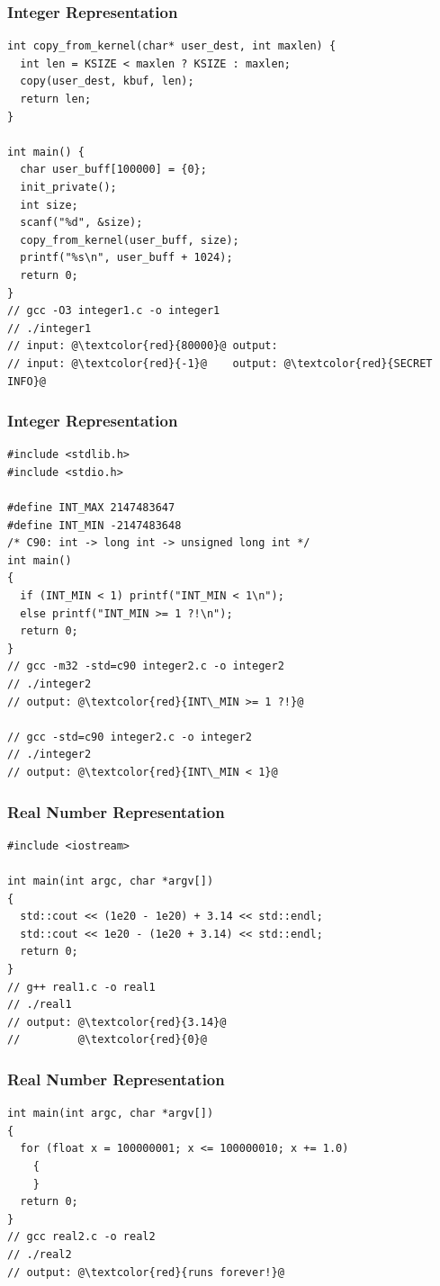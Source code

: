 \documentclass{beamer}
\begin{document}
\begin{frame}[fragile]
\frametitle{Integer Representation}
\scriptsize
\begin{lstlisting}
int copy_from_kernel(char* user_dest, int maxlen) {
  int len = KSIZE < maxlen ? KSIZE : maxlen;
  copy(user_dest, kbuf, len);
  return len;
}

int main() {
  char user_buff[100000] = {0};
  init_private();
  int size;
  scanf("%d", &size);
  copy_from_kernel(user_buff, size);
  printf("%s\n", user_buff + 1024);
  return 0;
}
// gcc -O3 integer1.c -o integer1
// ./integer1
// input: @\textcolor{red}{80000}@ output:
// input: @\textcolor{red}{-1}@    output: @\textcolor{red}{SECRET INFO}@
\end{lstlisting}

\end{frame}

\begin{frame}[fragile]
\frametitle{Integer Representation}
\scriptsize
\begin{lstlisting}
#include <stdlib.h>
#include <stdio.h>

#define INT_MAX 2147483647
#define INT_MIN -2147483648
/* C90: int -> long int -> unsigned long int */
int main()
{
  if (INT_MIN < 1) printf("INT_MIN < 1\n");
  else printf("INT_MIN >= 1 ?!\n");
  return 0;
}
// gcc -m32 -std=c90 integer2.c -o integer2
// ./integer2
// output: @\textcolor{red}{INT\_MIN >= 1 ?!}@

// gcc -std=c90 integer2.c -o integer2
// ./integer2
// output: @\textcolor{red}{INT\_MIN < 1}@
\end{lstlisting}

\end{frame}

\begin{frame}[fragile]
\frametitle{Real Number Representation}
\scriptsize
\begin{lstlisting}
#include <iostream>

int main(int argc, char *argv[])
{
  std::cout << (1e20 - 1e20) + 3.14 << std::endl;
  std::cout << 1e20 - (1e20 + 3.14) << std::endl;
  return 0;
}
// g++ real1.c -o real1
// ./real1
// output: @\textcolor{red}{3.14}@
//         @\textcolor{red}{0}@
\end{lstlisting}

\end{frame}

\begin{frame}[fragile]
\frametitle{Real Number Representation}
\scriptsize
\begin{lstlisting}
int main(int argc, char *argv[])
{
  for (float x = 100000001; x <= 100000010; x += 1.0)
    {
    }
  return 0;
}
// gcc real2.c -o real2
// ./real2
// output: @\textcolor{red}{runs forever!}@
\end{lstlisting}

\end{frame}
\end{document}
